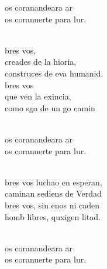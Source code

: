 \documentclass[12pt]{article}
\begin{document}
\begin{multicols*}{2}
\begin{cancion}%
	\begin{chorus}%
	os coranandeara ar\\
	os coranuerte para lur.\\
	\end{chorus}%
	\jump\\
	bres vos, \\
	creades de la hioria,\\
	construces de eva humanid.\\
	bres vos \\
	que ven la exincia,\\
	como sgo de un go camin\\\jump\\
	\begin{chorus}%
	os coranandeara ar\\
	os coranuerte para lur.\\
	\end{chorus}%
	\jump\\
	bres vos luchao en esperan,\\
	caminan sediens de Verdad\\
	bres vos, sin enos ni caden\\
	homb libres, quxigen litad.\\\jump\\
	\begin{chorus}%
	os coranandeara ar\\
	os coranuerte para lur.\\

\end{chorus}
\end{cancion}
\end{multicols*}
\end{document}
